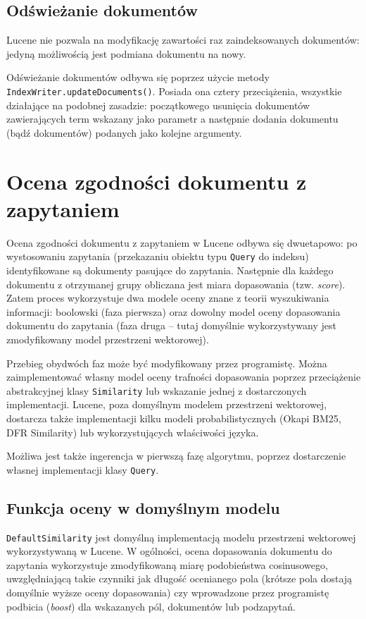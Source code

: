 \subsection{Odświeżanie dokumentów}

Lucene nie pozwala na modyfikację zawartości raz zaindeksowanych dokumentów: jedyną możliwością jest podmiana dokumentu na nowy.

Odświeżanie dokumentów odbywa się poprzez użycie metody \texttt{IndexWriter.updateDocuments()}. Posiada ona cztery przeciążenia, wszystkie działające na podobnej zasadzie: początkowego usunięcia dokumentów zawierających term wskazany jako parametr a następnie dodania dokumentu (bądź dokumentów) podanych jako kolejne argumenty. 

\section{Ocena zgodności dokumentu z zapytaniem}

Ocena zgodności dokumentu z zapytaniem w Lucene odbywa się dwuetapowo: po wystosowaniu zapytania (przekazaniu obiektu typu \texttt{Query} do indeksu) identyfikowane są dokumenty pasujące do zapytania. Następnie dla każdego dokumentu z otrzymanej grupy obliczana jest miara dopasowania (tzw. \emph{score}). Zatem proces wykorzystuje dwa modele oceny znane z teorii wyszukiwania informacji: boolowski (faza pierwsza) oraz dowolny model oceny dopasowania dokumentu do zapytania (faza druga -- tutaj domyślnie wykorzystywany jest zmodyfikowany model przestrzeni wektorowej). 

Przebieg obydwóch faz może być modyfikowany przez programistę. Można zaimplementować własny model oceny trafności dopasowania poprzez przeciążenie abstrakcyjnej klasy \texttt{Similarity} lub wskazanie jednej z dostarczonych implementacji. Lucene, poza domyślnym modelem przestrzeni wektorowej, dostarcza także implementacji kilku modeli probabilistycznych (Okapi BM25, DFR Similarity) lub wykorzystujących właściwości języka.

Możliwa jest także ingerencja w pierwszą fazę algorytmu, poprzez dostarczenie własnej implementacji klasy \texttt{Query}.

\subsection{Funkcja oceny w domyślnym modelu}

\texttt{DefaultSimilarity} jest domyślną implementacją modelu przestrzeni wektorowej wykorzystywaną w Lucene. W ogólności, ocena dopasowania dokumentu do zapytania wykorzystuje zmodyfikowaną miarę podobieństwa cosinusowego, uwzględniającą takie czynniki jak długość ocenianego pola (krótsze pola dostają domyślnie wyższe oceny dopasowania) czy wprowadzone przez programistę podbicia (\emph{boost}) dla wskazanych pól, dokumentów lub podzapytań.

